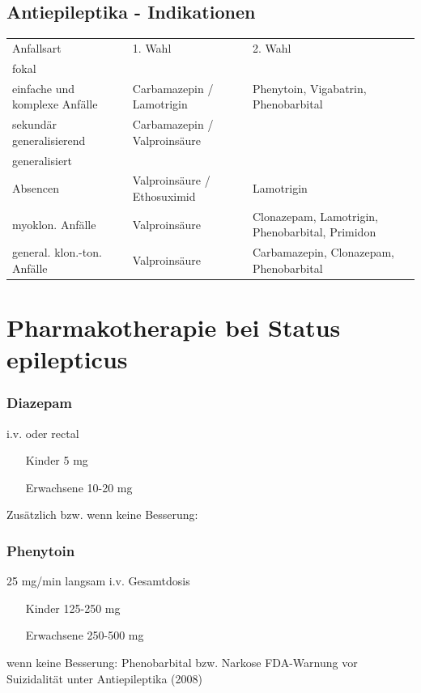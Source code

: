 \documentclass[10pt,a4paper]{report}
\begin{document}
\subsection{Antiepileptika - Indikationen} %
\label{sub:antiepileptika_indikationen}
\begin{tabularx}{\textwidth}{lXX}
Anfallsart&1. Wahl&2. Wahl\\  			
fokal&&\\
einfache und komplexe Anfälle&Carbamazepin / Lamotrigin&Phenytoin, 	Vigabatrin, Phenobarbital\\
sekundär generalisierend&Carbamazepin /  Valproinsäure&\\
generalisiert&&\\
Absencen&Valproinsäure / Ethosuximid&Lamotrigin\\
myoklon. Anfälle&Valproinsäure&Clonazepam, Lamotrigin, Phenobarbital, Primidon\\
general. klon.-ton. Anfälle&Valproinsäure&Carbamazepin, Clonazepam, Phenobarbital\\
\end{tabularx}
\section{Pharmakotherapie bei Status epilepticus} %
\label{sec:pharmakotherapie_bei_status_epilepticus}
\subsubsection{Diazepam} %
\label{ssub:diazepam}
i.v. oder rectal 
\begin{itemize}
	\item[Kinder] 5 mg
	\item[Erwachsene] 10-20 mg
\end{itemize}
Zusätzlich bzw. wenn keine Besserung:	
\subsubsection{Phenytoin} %
\label{ssub:phenytoin}
25 mg/min langsam i.v.	Gesamtdosis 
\begin{itemize}
	\item[Kinder] 125-250 mg
	\item[Erwachsene] 250-500 mg
\end{itemize}
wenn keine Besserung: Phenobarbital bzw. Narkose
FDA-Warnung vor Suizidalität unter Antiepileptika (2008)
\end{document}
